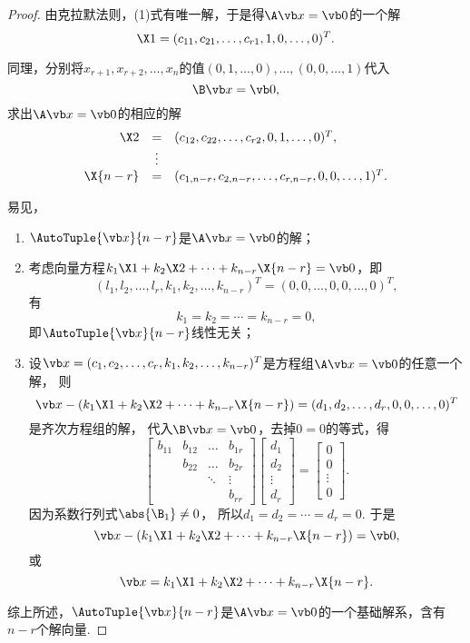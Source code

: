 \begin{theorem}
\begin{proof}
由克拉默法则，(1)式有唯一解，于是得\(\A\x=\vb0\)的一个解\[
\X1 = (c_{11},c_{21},\dotsc,c_{r1},1,0,\dotsc,0)^T.
\]

同理，分别将\(x_{r+1},x_{r+2},\dotsc,x_n\)的值\((0,1,\dotsc,0),\dotsc,(0,0,\dotsc,1)\)代入\[
	\B \x = \vb0,
\]
求出\(\A\x=\vb0\)的相应的解\[
	\begin{array}{rcl}
		\X2 &=& (c_{12},c_{22},\dotsc,c_{r2},0,1,\dotsc,0)^T, \\
		&\vdots& \\
		\X{n-r} &=& (c_{1,n-r},c_{2,n-r},\dotsc,c_{r,n-r},0,0,\dotsc,1)^T.
	\end{array}
\]

易见，\begin{enumerate}
	\item \(\AutoTuple{\x}{n-r}\)是\(\A\x=\vb0\)的解；

	\item 考虑向量方程\(k_1\X1+k_2\X2+\dotsb+k_{n-r}\X{n-r}=\vb0\)，即\[
		(l_1,l_2,\dotsc,l_r,k_1,k_2,\dotsc,k_{n-r})^T
		= (0,0,\dotsc,0,0,\dotsc,0)^T,
	\]
	有\[
		k_1 = k_2 = \dotsb = k_{n-r} = 0,
	\]
	即\(\AutoTuple{\x}{n-r}\)线性无关；

	\item 设\(\x=(c_1,c_2,\dotsc,c_r,k_1,k_2,\dotsc,k_{n-r})^T\)是方程组\(\A\x=\vb0\)的任意一个解，
	则\[
		\x - (k_1 \X1 + k_2 \X2 + \dotsb + k_{n-r} \X{n-r})
		= (d_1,d_2,\dotsc,d_r,0,0,\dotsc,0)^T
	\]是齐次方程组的解，
	代入\(\B\x=\vb0\)，去掉\(0 = 0\)的等式，得\[
		\begin{bmatrix}
			b_{11} & b_{12} & \dots & b_{1r} \\
			& b_{22} & \dots & b_{2r} \\
			& & \ddots & \vdots \\
			& & & b_{rr}
		\end{bmatrix}
		\begin{bmatrix}
			d_1 \\ d_2 \\ \vdots \\ d_r
		\end{bmatrix}
		= \begin{bmatrix}
			0 \\ 0 \\ \vdots \\ 0
		\end{bmatrix}.
	\]
	因为系数行列式\(\abs{\B_1} \neq 0\)，
	所以\(d_1 = d_2 = \dotsb = d_r = 0\).
	于是\[
		\x - (k_1 \X1 + k_2 \X2 + \dotsb + k_{n-r} \X{n-r}) = \vb0,
	\]或\[
		\x = k_1 \X1 + k_2 \X2 + \dotsb + k_{n-r} \X{n-r}.
	\]
\end{enumerate}

综上所述，\(\AutoTuple{\x}{n-r}\)是\(\A\x=\vb0\)的一个基础解系，含有\(n-r\)个解向量.
\end{proof}
\end{theorem}

